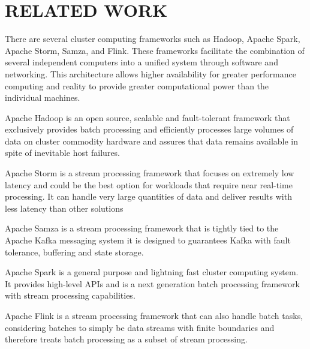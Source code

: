 \section{RELATED WORK}\label{sec:related}

There are several cluster computing frameworks such as Hadoop, Apache Spark, Apache Storm, Samza, and Flink. These frameworks facilitate the combination of several independent computers into a unified system through software and networking. This architecture allows higher availability for greater performance computing and reality to provide greater computational power than the individual machines.   

Apache Hadoop is an open source, scalable and fault-tolerant framework that exclusively provides batch processing and efficiently processes large volumes of data on cluster commodity hardware and assures that data remains available in spite of inevitable host failures. 

Apache Storm is a stream processing framework that focuses on extremely low latency and could be the best option for workloads that require near real-time processing. It can handle very large quantities of data and deliver results with less latency than other solutions  

Apache Samza is a stream processing framework that is tightly tied to the Apache Kafka messaging system it is designed to guarantees Kafka with fault tolerance, buffering and state storage.

Apache Spark is a general purpose and lightning fast cluster computing system. It provides high-level APIs and is a next generation batch processing framework with stream processing capabilities.

Apache Flink is a stream processing framework that can also handle batch tasks, considering batches to simply be data streams with finite boundaries and therefore treats batch processing as a subset of stream processing.
